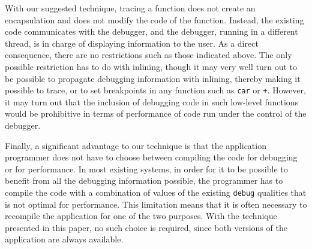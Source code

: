 With our suggested technique, tracing a function does not create an
encapsulation and does not modify the code of the function.  Instead,
the existing code communicates with the debugger, and the debugger,
running in a different thread, is in charge of displaying information
to the user.  As a direct consequence, there are no
restrictions such as those indicated above.  The only possible
restriction has to do with inlining, though it may very well turn out
to be possible to propagate debugging information with inlining,
thereby making it possible to trace, or to set breakpoints in any
function such as \texttt{car} or \texttt{+}.  However, it may turn out
that the inclusion of debugging code in such low-level functions would be
prohibitive in terms of performance of code run under the control of
the debugger.

Finally, a significant advantage to our technique is that the
application programmer does not have to choose between compiling the
code for debugging or for performance.  In most existing systems, in
order for it to be possible to benefit from all the debugging
information possible, the programmer has to compile the code with a
combination of values of the existing \texttt{debug} qualities that is
not optimal for performance.  This limitation means that it is often
necessary to recompile the application for one of the two purposes.
With the technique presented in this paper, no such choice is
required, since both versions of the application are always
available.

